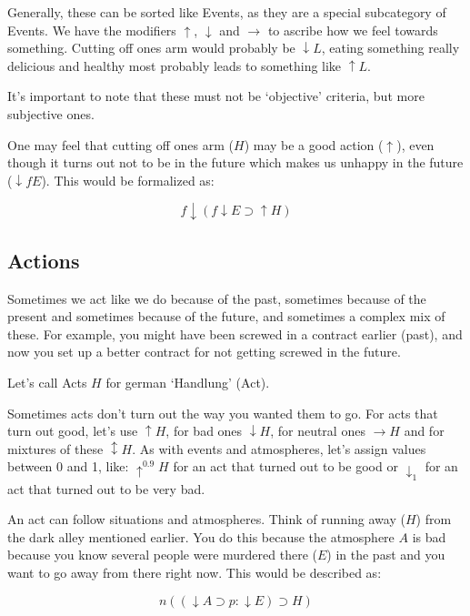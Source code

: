 \documentclass{scrartcl}
\begin{document}
Generally, these can be sorted like Events, as they are a special subcategory of Events. We have the modifiers $\uparrow$, $\downarrow$
and $\rightarrow$ to ascribe how we feel towards something. Cutting off ones arm would probably be $\downarrow L$, eating something
really delicious and healthy most probably leads to something like $\uparrow L$.

It's important to note that these must not be `objective' criteria, but more subjective ones. 

One may feel that cutting off ones arm ($H$)
may be a good action ($\uparrow$), even though it turns out not to be in the future  which makes us unhappy in the future ($\downarrow f E$).
This would be formalized as:

\begin{equation}
	f \downarrow \left( f\downarrow E \supset \uparrow H \right)
\end{equation}

\subsection{Actions}

Sometimes we act like we do because of the past, sometimes because of the present and sometimes because of the future, and sometimes
a complex mix of these. For example, you might have been screwed in a contract earlier (past), and now you set up a better contract
for not getting screwed in the future. 

Let's call Acts $H$ for german `Handlung' (Act).

Sometimes acts don't turn out the way you wanted them to go. For acts that turn out good, let's use $\uparrow H$, for bad ones 
$\downarrow H$, for neutral ones $\rightarrow H$ and for mixtures of these $\updownarrow H$. As with events and atmospheres,
let's assign values between 0 and 1, like: $\uparrow^{0.9} H$ for an act that turned out to be good or $\downarrow_1$ for an
act that turned out to be very bad.

An act can follow situations and atmospheres. Think of running away ($H$) from the dark alley mentioned earlier. You do this because the
atmosphere $A$ is bad because you know several people were murdered there ($E$) in the past and you want to go away from there right now. This would be
described as:

\begin{equation}
	n \left(\left(
		\downarrow A \supset p: \downarrow E
	\right) \supset H\right)
\end{equation}
\end{document}
